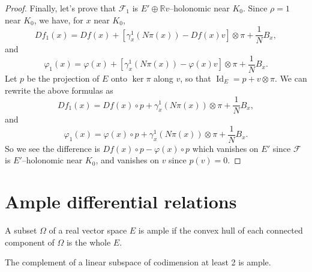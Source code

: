 \documentclass[10pt,a4paper]{article}
\DeclareMathOperator{\Id}{Id}
\newcommand{\F}{\mathcal{F}} %
\newcommand{\uses}[1]{}
\newcommand{\lean}[1]{}
\newcommand{\leanok}{}
\begin{document}
\begin{proof}
  Finally, let's prove that $\F_1$ is $E' ⊕ ℝv$--holonomic near $K_0$.
  Since $ρ = 1$ near $K_0$, we have, for $x$ near $K_0$,
  \[
    Df_1(x) = Df(x) + \left[γ^1_x(Nπ(x)) - Df(x)v\right] ⊗ π +
             \frac1N B_x,
  \]
  and
  \[
    φ_1(x) = φ(x) + \left[γ^1_x(Nπ(x)) - φ(x)v\right] ⊗ π +
            \frac{1}N B_x.
  \]
  Let $p$ be the projection of $E$ onto $\ker π$ along $v$,
  so that $\Id_E = p + v ⊗ π$.
  We can rewrite the above formulas as
  \[
    Df_1(x) = Df(x) ∘ p + γ^1_x(Nπ(x)) ⊗ π + \frac1N B_x,
  \]
  and
  \[
    φ_1(x) = φ(x) ∘ p + γ^1_x(Nπ(x)) ⊗ π + \frac{1}N B_x.
  \]
  So we see the difference is $Df(x) ∘ p - φ(x) ∘ p$ which vanishes on
  $E'$ since $\F$ is $E'$--holonomic near $K_0$, and vanishes on $v$ since
  $p(v) = 0$.
\end{proof}

\section{Ample differential relations}
\label{sec:ample_differential_relations}

\begin{definition}
  \label{def:ample_subset}
  \leanok
  \lean{AmpleSet}
  A subset $Ω$ of a real vector space $E$ is ample if the convex
  hull of each connected component of $Ω$ is the whole $E$.
\end{definition}

\begin{lemma}
  \label{lem:ample_codim_two}
  \uses{def:ample_subset}
  \lean{AmpleSet.of_one_lt_codim}
  \leanok
  The complement of a linear subspace of codimension at least 2 is
  ample.
\end{lemma}
\end{document}
